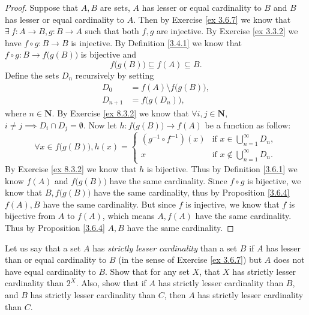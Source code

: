 \begin{proof}
    Suppose that \(A, B\) are sets, \(A\) has lesser or equal cardinality to \(B\) and \(B\) has lesser or equal cardinality to \(A\).
    Then by Exercise \ref{ex 3.6.7} we know that \(\exists\ f : A \to B, g : B \to A\) such that both \(f, g\) are injective.
    By Exercise \ref{ex 3.3.2} we have \(f \circ g : B \to B\) is injective.
    By Definition \ref{3.4.1} we know that \(f \circ g : B \to f\big(g(B)\big)\) is bijective and
    \[
        f\big(g(B)\big) \subseteq f(A) \subseteq B.
    \]
    Define the sets \(D_n\) recursively by setting
    \begin{align*}
        D_0       & = f(A) \setminus f\big(g(B)\big), \\
        D_{n + 1} & = f\big(g(D_n)\big),
    \end{align*}
    where \(n \in \mathbf{N}\).
    By Exercise \ref{ex 8.3.2} we know that \(\forall i, j \in \mathbf{N}\), \(i \neq j \implies D_i \cap D_j = \emptyset\).
    Now let \(h : f\big(g(B)\big) \to f(A)\) be a function as follow:
    \[
        \forall x \in f\big(g(B)\big), h(x) = \begin{cases}
            (g^{-1} \circ f^{-1})(x) & \text{if } x \in \bigcup_{n = 1}^\infty D_n,    \\
            x                        & \text{if } x \notin \bigcup_{n = 1}^\infty D_n.
        \end{cases}
    \]
    By Exercise \ref{ex 8.3.2} we know that \(h\) is bijective.
    Thus by Definition \ref{3.6.1} we know \(f(A)\) and \(f\big(g(B)\big)\) have the same cardinality.
    Since \(f \circ g\) is bijective, we know that \(B, f\big(g(B)\big)\) have the same cardinality, thus by Proposition \ref{3.6.4} \(f(A), B\) have the same cardinality.
    But since \(f\) is injective, we know that \(f\) is bijective from \(A\) to \(f(A)\), which means \(A, f(A)\) have the same cardinality.
    Thus by Proposition \ref{3.6.4} \(A, B\) have the same cardinality.
\end{proof}

\begin{exercise}\label{ex 8.3.4}
    Let us say that a set \(A\) has \emph{strictly lesser cardinality} than a set \(B\) if \(A\) has lesser than or equal cardinality to \(B\) (in the sense of Exercise \ref{ex 3.6.7}) but \(A\) does not have equal cardinality to \(B\).
    Show that for any set \(X\), that \(X\) has strictly lesser cardinality than \(2^X\).
    Also, show that if \(A\) has strictly lesser cardinality than \(B\), and \(B\) has strictly lesser cardinality than \(C\), then \(A\) has strictly lesser cardinality than \(C\).
\end{exercise}

